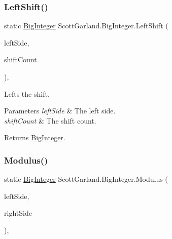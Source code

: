 \subsubsection{\texorpdfstring{Left\+Shift()}{LeftShift()}}
{\footnotesize\ttfamily static \hyperlink{class_scott_garland_1_1_big_integer}{Big\+Integer} Scott\+Garland.\+Big\+Integer.\+Left\+Shift (\begin{DoxyParamCaption}\item[{\hyperlink{class_scott_garland_1_1_big_integer}{Big\+Integer}}]{left\+Side,  }\item[{int}]{shift\+Count }\end{DoxyParamCaption})\hspace{0.3cm}{\ttfamily [inline]}, {\ttfamily [static]}}



Lefts the shift. 


\begin{DoxyParams}{Parameters}
{\em left\+Side} & The left side.\\
\hline
{\em shift\+Count} & The shift count.\\
\hline
\end{DoxyParams}
\begin{DoxyReturn}{Returns}
\hyperlink{class_scott_garland_1_1_big_integer}{Big\+Integer}.
\end{DoxyReturn}
\mbox{\label{class_scott_garland_1_1_big_integer_a99ca834445147bc4de1d108376a790c3}} 
\subsubsection{\texorpdfstring{Modulus()}{Modulus()}}
{\footnotesize\ttfamily static \hyperlink{class_scott_garland_1_1_big_integer}{Big\+Integer} Scott\+Garland.\+Big\+Integer.\+Modulus (\begin{DoxyParamCaption}\item[{\hyperlink{class_scott_garland_1_1_big_integer}{Big\+Integer}}]{left\+Side,  }\item[{\hyperlink{class_scott_garland_1_1_big_integer}{Big\+Integer}}]{right\+Side }\end{DoxyParamCaption})\hspace{0.3cm}{\ttfamily [inline]}, {\ttfamily [static]}}



